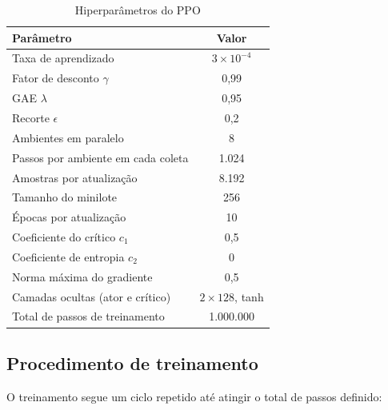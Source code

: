 \begin{table}[htb]
    \centering
    \caption{Hiperparâmetros do PPO}
    \label{tab:ppo}
    \begin{tabular}{lc}
        \hline
        Parâmetro & Valor \\
        \hline
        Taxa de aprendizado                     & $3 \times 10^{-4}$ \\
        Fator de desconto $\gamma$              & 0,99 \\
        GAE $\lambda$                           & 0,95 \\
        Recorte $\epsilon$                      & 0,2 \\
        Ambientes em paralelo                   & 8 \\
        Passos por ambiente em cada coleta      & 1.024 \\
        Amostras por atualização                & 8.192 \\
        Tamanho do minilote                     & 256 \\
        Épocas por atualização                  & 10 \\
        Coeficiente do crítico $c_1$            & 0,5 \\
        Coeficiente de entropia $c_2$           & 0 \\
        Norma máxima do gradiente               & 0,5 \\
        Camadas ocultas (ator e crítico)        & $2 \times 128$, tanh \\
        Total de passos de treinamento          & 1.000.000 \\
        \hline
    \end{tabular}
\end{table}

\subsection{Procedimento de treinamento}

O treinamento segue um ciclo repetido até atingir o total de passos definido:

